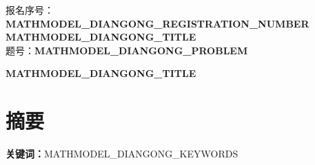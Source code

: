 \documentclass[12pt,a4paper]{ctexart}
\begin{document}
\begin{titlepage}
\thispagestyle{empty}
\begin{center}
\vspace*{3cm}
{\Large 报名序号：\textbf{MATHMODEL_DIANGONG_REGISTRATION_NUMBER}}\\[2cm]
{\Huge \textbf{MATHMODEL_DIANGONG_TITLE}}\\[1cm]
{\Large 题号：\textbf{MATHMODEL_DIANGONG_PROBLEM}}
\end{center}
\end{titlepage}

\clearpage
{}
\pagestyle{plain}
\begin{center}
{\bfseries MATHMODEL_DIANGONG_TITLE}
\end{center}
\section*{摘要}

\textbf{关键词：}MATHMODEL_DIANGONG_KEYWORDS

\clearpage








\appendix
\end{document}
